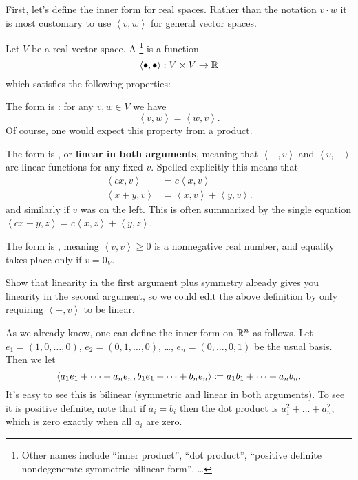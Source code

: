 First, let's define the inner form for real spaces.
Rather than the notation $v \cdot w$ it is most customary
to use $\left< v,w \right>$ for general vector spaces.
\begin{definition}
	Let $V$ be a real vector space.
	A \footnote{Other
		names include ``inner product'', ``dot product'',
		``positive definite nondegenerate symmetric bilinear form'', \dots}
	is a function
	\[ \left< \bullet, \bullet \right> : V \times V \to \mathbb R \]
	which satisfies the following properties:
	\begin{itemize}
		\ii The form is : for any $v,w \in V$ we have
		\[ \left< v,w \right> = \left< w,v\right>. \]
		Of course, one would expect this property from a product.

		\ii The form is , or \textbf{linear in both arguments},
		meaning that $\left< -, v\right>$
		and $\left< v, -\right>$ are linear functions for any fixed $v$.
		Spelled explicitly this means that
		\begin{align*}
			\left< cx, v \right> &= c \left< x,v \right> \\
			\left< x+y, v \right> &= \left< x,v \right> + \left< y,v \right>.
		\end{align*}
		and similarly if $v$ was on the left.
		This is often summarized by the single equation
		$\left< cx+y, z \right> = c \left< x,z \right> + \left< y,z \right>$.

		\ii The form is , meaning $\left<v,v\right> \ge 0$
		is a nonnegative real number, and equality takes place only if $v = 0_V$.
	\end{itemize}
\end{definition}
\begin{exercise}
	Show that linearity in the first argument plus symmetry
	already gives you linearity in the second argument,
	so we could edit the above definition
	by only requiring $\left< -, v\right>$ to be linear.
\end{exercise}

\begin{example}
	[$\RR^n$]
	As we already know, one can define the inner form on $\RR^n$ as follows.
	Let $e_1 = (1, 0, \dots, 0)$, $e_2 = (0, 1, \dots, 0)$,
	\dots, $e_n = (0, \dots, 0, 1)$ be the usual basis.
	Then we let
	\[ 
		\left< a_1 e_1 + \dots + a_n e_n, b_1 e_1 + \dots + b_n e_n \right>
		\coloneqq a_1 b_1 + \dots + a_n b_n.
	\]
	It's easy to see this is bilinear
	(symmetric and linear in both arguments).
	To see it is positive definite,
	note that if $a_i = b_i$
	then the dot product is $a_1^2 + \dots + a_n^2$,
	which is zero exactly when all $a_i$ are zero.
\end{example}


